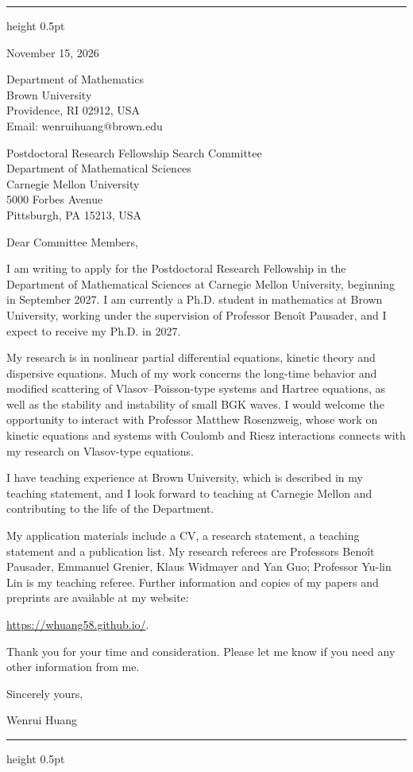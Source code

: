 \documentclass[10pt]{article}
\begin{document}
\vspace{0.08in}
\hrule height 0.5pt

\vspace{0.47in}
\hfill
\begin{minipage}{2.27in}
November 15, 2026

\vspace{0.16in}
Department of Mathematics\\
Brown University\\
Providence, RI 02912, USA\\
Email: wenrui\textunderscore huang@brown.edu
\end{minipage}

\vspace{0.30in}
Postdoctoral Research Fellowship Search Committee\\
Department of Mathematical Sciences\\
Carnegie Mellon University\\
5000 Forbes Avenue\\
Pittsburgh, PA 15213, USA

\vspace{0.16in}
Dear Committee Members,

I am writing to apply for the Postdoctoral Research Fellowship in the Department of Mathematical Sciences at Carnegie Mellon University, beginning in September 2027. I am currently a Ph.D. student in mathematics at Brown University, working under the supervision of Professor Beno\^{i}t Pausader, and I expect to receive my Ph.D. in 2027.

My research is in nonlinear partial differential equations, kinetic theory and dispersive equations. Much of my work concerns the long-time behavior and modified scattering of Vlasov--Poisson-type systems and Hartree equations, as well as the stability and instability of small BGK waves. I would welcome the opportunity to interact with Professor Matthew Rosenzweig, whose work on kinetic equations and systems with Coulomb and Riesz interactions connects with my research on Vlasov-type equations.

I have teaching experience at Brown University, which is described in my teaching statement, and I look forward to teaching at Carnegie Mellon and contributing to the life of the Department.

My application materials include a CV, a research statement, a teaching statement and a publication list. My research referees are Professors Beno\^{i}t Pausader, Emmanuel Grenier, Klaus Widmayer and Yan Guo; Professor Yu-lin Lin is my teaching referee. Further information and copies of my papers and preprints are available at my website:

\url{https://whuang58.github.io/}.

\medskip
Thank you for your time and consideration. Please let me know if you need any other information from me.

\vspace{0.12in}
Sincerely yours,

\vspace{0.12in}
Wenrui Huang

\vfill
\hrule height 0.5pt
\end{document}
